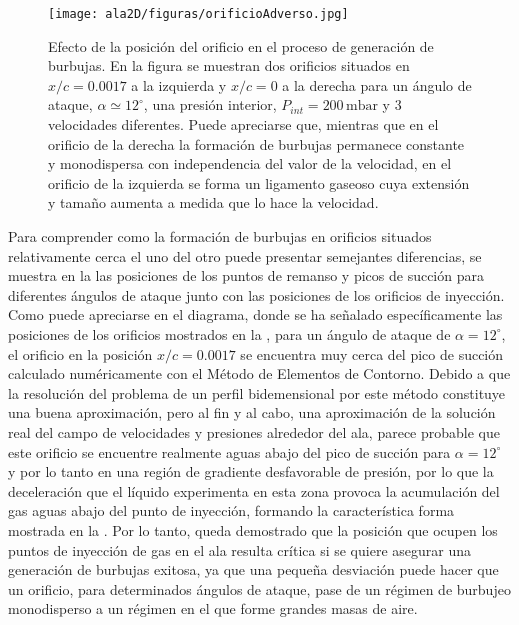 \begin{figure}
\centering
\texttt{[image: ala2D/figuras/orificioAdverso.jpg]}
\caption{Efecto de la posición del orificio en el proceso de generación de burbujas. En la figura se muestran dos orificios situados en $x/c = 0.0017$ a la izquierda y $x/c = 0$ a la derecha para un ángulo de ataque, $\alpha \simeq 12^{\circ}$, una presión interior, $P_{int} = 200\,\mathrm{mbar}$ y 3 velocidades diferentes. Puede apreciarse que, mientras que en el orificio de la derecha la formación de burbujas permanece constante y monodispersa con independencia del valor de la velocidad, en el orificio de la izquierda se forma un ligamento gaseoso cuya extensión y tamaño aumenta a medida que lo hace la velocidad. }
\end{figure}

Para comprender como la formación de burbujas en orificios situados relativamente cerca el uno del otro puede presentar semejantes diferencias, se muestra en la  las posiciones de los puntos de remanso y picos de succión para diferentes ángulos de ataque junto con las posiciones de los orificios de inyección. Como puede apreciarse en el diagrama, donde se ha señalado específicamente las posiciones de los orificios mostrados en la , para un ángulo de ataque de $\alpha = 12^{\circ}$, el orificio en la posición $x/c = 0.0017$ se encuentra muy cerca del pico de succión calculado numéricamente con el Método de Elementos de Contorno. Debido a que la resolución del problema de un perfil bidemensional por este método constituye una buena aproximación, pero al fin y al cabo, una aproximación de la solución real del campo de velocidades y presiones alrededor del ala, parece probable que este orificio se encuentre realmente aguas abajo del pico de succión para $\alpha = 12^{\circ}$ y por lo tanto en una región de gradiente desfavorable de presión, por lo que la deceleración que el líquido experimenta en esta zona provoca la acumulación del gas aguas abajo del punto de inyección, formando la característica forma mostrada en la . Por lo tanto, queda demostrado que la posición que ocupen los puntos de inyección de gas en el ala resulta crítica si se quiere asegurar una generación de burbujas exitosa, ya que una pequeña desviación puede hacer que un orificio, para determinados ángulos de ataque, pase de un régimen de burbujeo monodisperso a un régimen en el que forme grandes masas de aire. 

